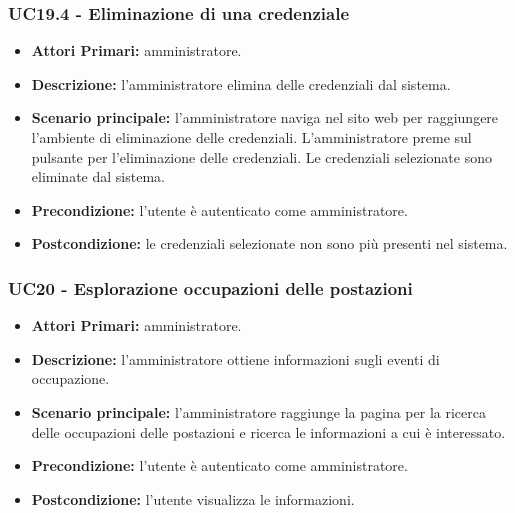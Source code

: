 \subsubsection{ UC19.4 - Eliminazione di una credenziale}
\begin{itemize}
	\item\textbf{Attori Primari:} 
	amministratore.
	\item\textbf{Descrizione:} 
	l'amministratore elimina delle credenziali dal sistema.
	\item\textbf{Scenario principale:} 
	l'amministratore naviga nel sito web per raggiungere l'ambiente di eliminazione delle credenziali.
	L'amministratore preme sul pulsante per l'eliminazione delle credenziali.
	Le credenziali selezionate sono eliminate dal sistema.
	\item\textbf{Precondizione:} 
	l'utente è autenticato come amministratore.
	\item\textbf{Postcondizione:}
	le credenziali selezionate non sono più presenti nel sistema.
\end{itemize}

\subsubsection{ UC20 - Esplorazione occupazioni delle postazioni}
\begin{itemize}
	\item\textbf{Attori Primari:} 
	amministratore.
	\item\textbf{Descrizione:} 
	l'amministratore ottiene informazioni sugli eventi di occupazione.
	\item\textbf{Scenario principale:} 
	l'amministratore raggiunge la pagina per la ricerca delle occupazioni delle postazioni e ricerca le informazioni a cui è interessato.
	\item\textbf{Precondizione:} 
	l'utente è autenticato come amministratore.
	\item\textbf{Postcondizione:}
	l'utente visualizza le informazioni.
\end{itemize}

